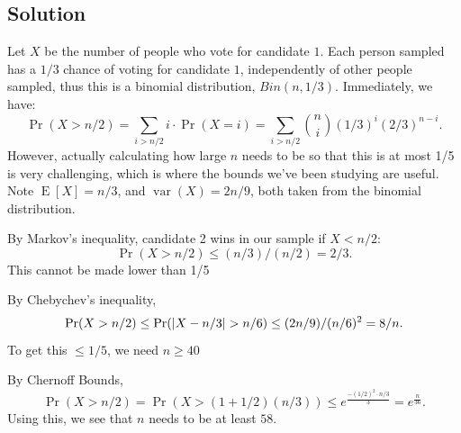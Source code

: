 \documentclass{article}
\newcommand{\Var}[1]{\operatorname{var}\left(#1\right)}
\newcommand{\E}[1]{\operatorname{E}\left[#1\right]}
\DeclarePairedDelimiter\abs{\lvert}{\rvert}%
\begin{document}
\subsection*{Solution}
  Let $X$ be the number of people who vote for candidate $1$. Each person
  sampled has a $1/3$ chance of voting for candidate $1$, independently of
  other people sampled, thus this is a binomial distribution, $Bin(n, 1/3)$.
  Immediately, we have: $$\Pr(X > n/2) = \sum_{i > n/2} i \cdot \Pr(X=i) =  \sum_{i > n/2} \binom{n}{i} (1/3)^i (2/3)^{n-i}.$$  However, actually calculating how large $n$ needs to be so that this is at most 1/5 is very challenging, which is where the bounds we've been studying are useful. Note
  $\E{X} = n/3$, and $\Var{X} = 2n/9$, both taken from the binomial
  distribution.

    \vspace{2mm}
  By Markov's inequality, candidate 2 wins in our sample if $X < n/2$: $$\Pr(X
  > n/2) \leq (n/3)/(n/2) = 2/3.$$ This cannot be made lower than 1/5
  
\vspace{2mm}
  By Chebychev's inequality, $$\Pr(X > n/2) \leq \Pr(\abs{X - n/3} > n/6) \leq
  (2n/9) / (n/6)^2 = 8/n.$$ To get this $\leq 1/5$, we need $n \geq 40$
  
\vspace{2mm}
  By Chernoff Bounds, $$\Pr(X > n/2) = \Pr(X > (1 + 1/2)(n/3)) \leq e^{\frac{
  -(1/2)^2 \cdot n/3}{3}} = e^{\frac{n}{36}}.$$
  Using this, we see that $n$ needs to be at least $58$.

 
\end{document}

